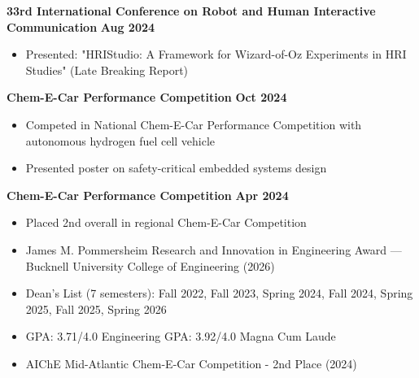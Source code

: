 \documentclass{article}
\begin{document}
 \hfill {}

\textbf{33rd International Conference on Robot and Human Interactive Communication} \hfill \textbf{Aug 2024}
\begin{itemize}[noitemsep,topsep=2pt]
    \item Presented: "HRIStudio: A Framework for Wizard-of-Oz Experiments in HRI Studies" (Late Breaking Report)
\end{itemize}

 \hfill {}

\textbf{Chem-E-Car Performance Competition} \hfill \textbf{Oct 2024}
\begin{itemize}[noitemsep,topsep=2pt]
    \item Competed in National Chem-E-Car Performance Competition with autonomous hydrogen fuel cell vehicle
    \item Presented poster on safety-critical embedded systems design
\end{itemize}

 \hfill {}

\textbf{Chem-E-Car Performance Competition} \hfill \textbf{Apr 2024}
\begin{itemize}[noitemsep,topsep=2pt]
    \item Placed 2nd overall in regional Chem-E-Car Competition
\end{itemize}





\begin{itemize}[noitemsep,topsep=2pt]
    \item James M. Pommersheim Research and Innovation in Engineering Award --- Bucknell University College of Engineering (2026)
    \item Dean's List (7 semesters): Fall 2022, Fall 2023, Spring 2024, Fall 2024, Spring 2025, Fall 2025, Spring 2026
    \item GPA: 3.71/4.0 \textbullet{} Engineering GPA: 3.92/4.0 \textbullet{} Magna Cum Laude
    \item AIChE Mid-Atlantic Chem-E-Car Competition - 2nd Place (2024)
\end{itemize}
\end{document}
